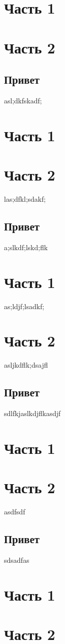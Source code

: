 \documentclass[a4paper,10pt]{article}
\begin{document}
\section{Часть 1}

\section{Часть 2}
\subsection{Привет}
asl;dkfskadf;
\section{Часть 1}

\section{Часть 2}
las;dfkl;sdakf;
\subsection{Привет}
a;slkdf;lskd;flk
\section{Часть 1}
as;ldjf;lsadkf;
\section{Часть 2}
asljkdflk;dsajfl
\subsection{Привет}
sdlfkjaslkdjflkasdjf
\section{Часть 1}

\section{Часть 2}
asdfsdf
\subsection{Привет}
sdsadfas
\section{Часть 1}

\lipsum[6-20]
\lipsum[12-30]

\section{Часть 2}

\label{lastpage}
\end{document}
